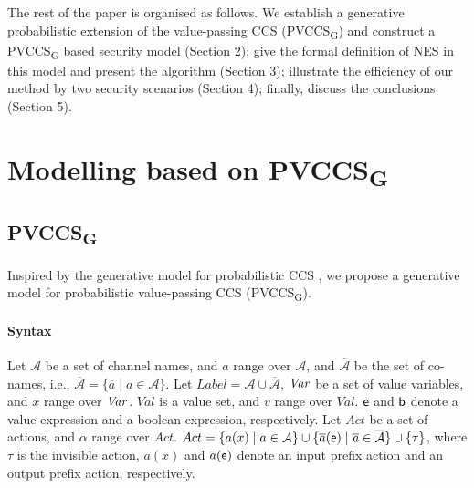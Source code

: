 \documentclass[10pt, conference, compsocconf]{IEEEtran}
\begin{document}
The rest of the paper is organised as follows.
We establish a generative probabilistic extension of the value-passing CCS (PVCCS\textsubscript{G}) and construct a PVCCS\textsubscript{G} based security model (Section 2);
give the formal definition of NES in this model and present the algorithm (Section 3);
illustrate the efficiency of our method by two security scenarios (Section 4);
finally, discuss the conclusions (Section 5).

\section{Modelling based on PVCCS\textsubscript{G}}
\newtheorem{definition}{Definition}[section]
\newtheorem{Theorem}{Theorem}[section]
\newtheorem{Lemma}{Lemma}[section]


\subsection{ PVCCS\textsubscript{G}}
Inspired by the generative model for probabilistic CCS \cite{rob}, we propose a generative model for probabilistic value-passing CCS (PVCCS\textsubscript{G}).
\paragraph{Syntax}
Let $\mathbf{\mathcal{A}}$ be a set of channel names, and $a$ range over $\mathbf{\mathcal{A}}$, and $\mathbf{\mathcal{\overline{A}}}$ be the set of co-names, i.e., $\mathbf{\mathcal{\overline{A}}}=\{\overline{a}\mid a\in \mathbf{\mathcal{A}}\}$.
Let $Label=\mathcal{A} \cup \mathcal{\overline{A}}$, ${\it Var}$ be a set of value variables, and $x$ range over ${\it Var}$.   $\mathit{Val}$ is a value set, and $v$ range over $\mathit{Val}$.
$\sf e$ and $\sf b$ denote a value expression and a boolean expression, respectively.
Let $Act$ be a set of actions, and $\alpha$ range over $Act$. $Act=\{a(x)\mid a\in \mathcal{A}\}\cup \{\overline{a}(\sf e)\mid \overline{\it a}\in \mathcal{\overline{A}}\}\cup \{\tau \}$, where $\tau$ is the invisible action, $a(x)$ and $\overline{a}(\sf e)$ denote an input prefix action and an output prefix action, respectively.
\end{document}

